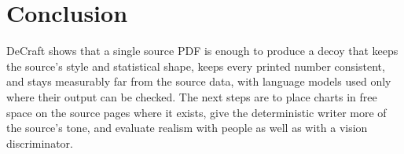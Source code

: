 \documentclass[10pt,twocolumn]{article}
\begin{document}
\section{Conclusion}

DeCraft shows that a single source PDF is enough to produce a decoy that keeps the source's style
and statistical shape, keeps every printed number consistent, and stays measurably far from the
source data, with language models used only where their output can be checked. The next steps
are to place charts in free space on the source pages where it exists, give the deterministic
writer more of the source's tone, and evaluate realism with people as well as with a vision
discriminator.
\end{document}
